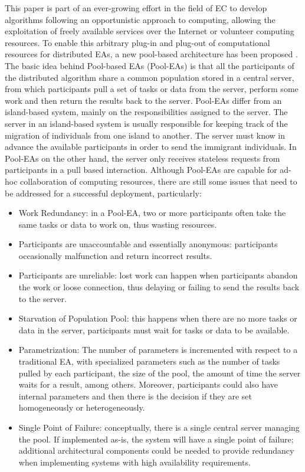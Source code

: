 This paper is part of an ever-growing effort in the field of EC to develop algorithms following an opportunistic approach to computing, allowing the exploitation of freely available services over the Internet or volunteer computing resources. To enable this arbitrary plug-in and plug-out of computational resources for distributed EAs, a new pool-based architecture has been proposed \cite{sofea1,sofea2,PoolvsIsland}. The basic idea behind Pool-based EAs (Pool-EAs) is that all the participants of the distributed algorithm share a common population stored in a central server, from which participants pull a set of tasks or data from the server, perform some work and then return the results back to the server. Pool-EAs differ from an island-based system,
mainly on the responsibilities assigned to the server. The server in an island-based system is usually responsible for keeping track of the migration of individuals from one island to another. The server must know in advance the available participants in order to send the immigrant individuals. In Pool-EAs on the other hand, the server only receives stateless requests from participants in a pull based interaction. 
Although Pool-EAs are capable for ad-hoc collaboration of computing resources, there are still some issues that need to be addressed for a successful deployment, particularly:
\begin{itemize}
	\item Work Redundancy: in a Pool-EA, two or more participants often take the same tasks or data to work on, thus wasting resources.
	  
	\item Participants are unaccountable and essentially anonymous: participants occasionally malfunction and return incorrect results. 
	
	\item Participants are unreliable: lost work can happen when participants  abandon the work or loose connection, thus delaying or failing to send the results back to the server.
	\item Starvation of Population Pool: this happens when there are no more tasks or data in the server, participants must wait for tasks or data to be available. 
	\item Parametrization: The number of parameters is incremented with respect to a traditional EA, with specialized parameters such as the number of tasks pulled by each participant, the size of the pool, the amount of time the server waits for a result, among others. Moreover, participants could also have internal parameters and then there is the decision if they are set homogeneously or heterogeneously.
	\item Single Point of Failure: conceptually, there is a single central server managing the pool. If implemented as-is, the system will have a single point of failure; additional architectural components could be needed to provide redundancy when implementing systems with high availability requirements.  	
\end{itemize}
        
